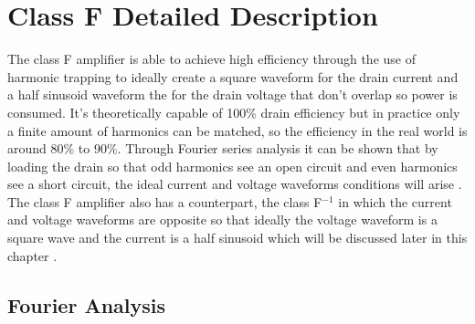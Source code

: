 ﻿\chapter{Class F Detailed Description }

The class F amplifier is able to achieve high efficiency through the use of harmonic trapping to ideally create a square waveform for the drain current and a half sinusoid waveform the for the drain voltage that don't overlap so power is consumed. It's theoretically capable of 100\% drain efficiency but in practice only a finite amount of harmonics can be matched, so the efficiency in the real world is around 80\% to 90\%. Through Fourier series analysis it can be shown that by loading the drain so that odd harmonics see an open circuit and even harmonics see a short circuit, the ideal current and voltage waveforms conditions will arise \cite{Gao2006}. The class F amplifier also has a counterpart, the class F$^{-1}$ in which the current and voltage waveforms are opposite so that ideally the voltage waveform is a square wave and the current is a half sinusoid which will be discussed later in this chapter \cite{Moon2012}.

\section{Fourier Analysis}

